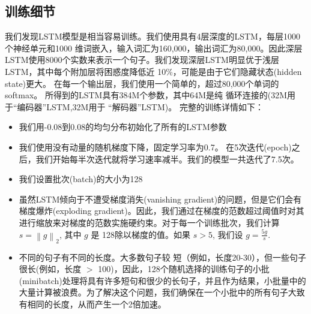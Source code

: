 


\subsection{训练细节}

我们发现LSTM模型是相当容易训练。我们使用具有4层深度的LSTM，每层1000个神经单元和1000
维词嵌入，输入词汇为160,000，输出词汇为80,000。因此深层LSTM使用8000个实数来表示一个句子。我们发现深层LSTM明显优于浅层LSTM，其中每个附加层将困惑度降低近 10\%，可能是由于它们隐藏状态(hidden state)更大。  在每一个输出层，我们使用一个简单的，超过80,000个单词的softmax。
所得到的LSTM具有384M个参数，其中64M是纯
循环连接的(32M用于“编码器”LSTM,32M用于
``解码器''LSTM)。 完整的训练详情如下：
\begin{itemize}
\item 我们用-0.08到0.08的均匀分布初始化了所有的LSTM参数
\item 我们使用没有动量的随机梯度下降，固定学习率为0.7。 在5次迭代(epoch)之后，我们开始每半次迭代就将学习速率减半。我们的模型一共迭代了7.5次。
\item 我们设置批次(batch)的大小为128
\item 虽然LSTM倾向于不遭受梯度消失(vanishing gradient)的问题，但是它们会有梯度爆炸(exploding gradient)。因此，我们通过在梯度的范数超过阈值时对其进行缩放来对梯度的范数实施硬约束\cite{graves13c,razvan}。对于每一个训练批次，我们计算 $s =
  \left\|g\right\|_2$, 其中 $g$ 是 128除以梯度的值。如果 $s > 5$, 我们设
  $g = \frac{5g}{s}$.
\item 不同的句子有不同的长度。大多数句子较
短（例如，长度20-30），但一些句子很长(例如，长度
  $>$ 100)，因此，128个随机选择的训练句子的小批(minibatch)处理将具有许多短句和很少的长句子，并且作为结果，小批量中的大量计算被浪费。为了解决这个问题，我们确保在一个小批中的所有句子大致有相同的长度，从而产生一个2倍加速。
\end{itemize}


